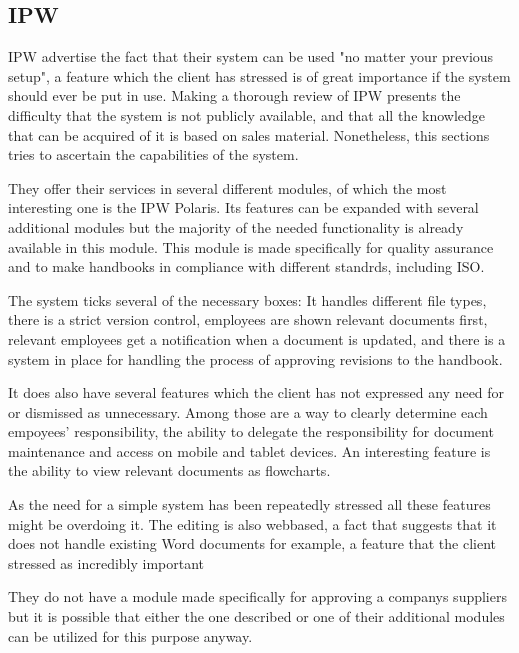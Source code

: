 \subsection{IPW}
IPW advertise the fact that their system can be used "no matter your previous setup", a feature which the client has stressed is of great importance if the system should ever be put in use.
Making a thorough review of IPW presents the difficulty that the system is not publicly available, and that all the knowledge that can be acquired of it is based on sales material. Nonetheless, this sections tries to ascertain the capabilities of the system.

They offer their services in several different modules, of which the most interesting one is the IPW Polaris.
Its features can be expanded with several additional modules but the majority of the needed functionality is already available in this module.
This module is made specifically for quality assurance and to make handbooks in compliance with different standrds, including ISO.

The system ticks several of the necessary boxes: It handles different file types, there is a strict version control, employees are shown relevant documents first, relevant employees get a notification when a document is updated, and there is a system in place for handling the process of approving revisions to the handbook.

It does also have several features which the client has not expressed any need for or dismissed as unnecessary.
Among those are a way to clearly determine each empoyees' responsibility, the ability to delegate the responsibility for document maintenance and access on mobile and tablet devices.
An interesting feature is the ability to view relevant documents as flowcharts.

As the need for a simple system has been repeatedly stressed all these features might be overdoing it.
The editing is also webbased, a fact that suggests that it does not handle existing Word documents for example, a feature that the client stressed as incredibly important

They do not have a module made specifically for approving a companys suppliers but it is possible that either the one described or one of their additional modules can be utilized for this purpose anyway.
